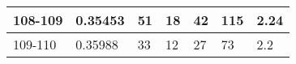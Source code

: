 \begin{table}[!h]
\begin{tabular}{|l|l|l|l|l|l|l|}
108-109                                       & 0.35453                                       & 51                                            & 18                                            & 42                                            & 115                                           & 2.24                                          \\ \hline
109-110                                       & 0.35988                                       & 33                                            & 12                                            & 27                                            & 73                                            & 2.2                                           \\ \hline
\end{tabular}
\end{table}

